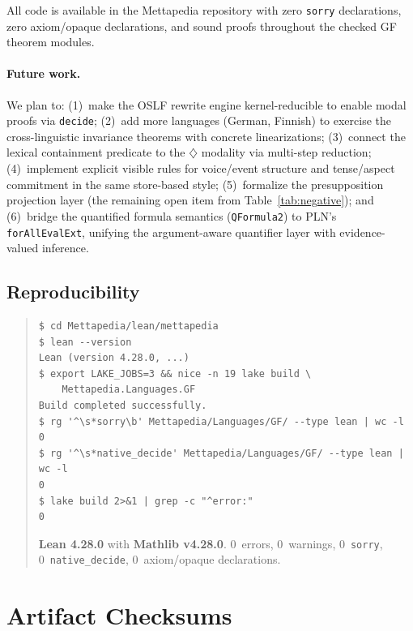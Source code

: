 \documentclass[11pt]{article}
\newcommand{\code}[1]{\texttt{#1}}
\newcommand{\Dia}{\ensuremath{\diamondsuit}}
\newcommand{\OSLF}{\textup{OSLF}}
\newcommand{\GF}{\textup{GF}}
\begin{document}
All code is available in the Mettapedia repository with zero
\code{sorry} declarations, zero axiom/opaque declarations, and sound proofs
throughout the checked \GF{} theorem modules.

\paragraph{Future work.}  We plan to: (1)~make the \OSLF{} rewrite engine
kernel-reducible to enable modal proofs via \code{decide}; (2)~add more
languages (German, Finnish) to exercise the cross-linguistic invariance
theorems with concrete linearizations; (3)~connect the lexical containment
predicate to the $\Dia$ modality via multi-step reduction;
(4)~implement explicit visible rules for voice/event structure and
tense/aspect commitment in the same store-based style;
(5)~formalize the presupposition projection layer (the remaining
open item from Table~\ref{tab:negative}); and
(6)~bridge the quantified formula semantics (\code{QFormula2}) to
PLN's \code{forAllEvalExt}, unifying the argument-aware quantifier
layer with evidence-valued inference.

\subsection*{Reproducibility}

\begin{quote}
\small
\begin{verbatim}
$ cd Mettapedia/lean/mettapedia
$ lean --version
Lean (version 4.28.0, ...)
$ export LAKE_JOBS=3 && nice -n 19 lake build \
    Mettapedia.Languages.GF
Build completed successfully.
$ rg '^\s*sorry\b' Mettapedia/Languages/GF/ --type lean | wc -l
0
$ rg '^\s*native_decide' Mettapedia/Languages/GF/ --type lean | wc -l
0
$ lake build 2>&1 | grep -c "^error:"
0
\end{verbatim}

\textbf{Lean 4.28.0} with \textbf{Mathlib v4.28.0}.
0~errors, 0~warnings, 0~\code{sorry},
0~\code{native\_decide}, 0~axiom/opaque declarations.
\end{quote}




\appendix
\section{Artifact Checksums}
\label{app:artifact}
\end{document}
